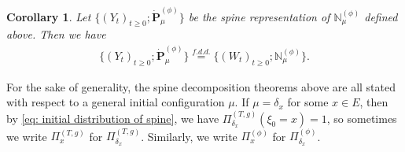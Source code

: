 \documentclass[UTF8]{pkuthss}
\theoremstyle{plain}
\newtheorem{cor}[thm]{Corollary}
\theoremstyle{definition}
\numberwithin{equation}{section}
\begin{document}
\begin{cor}
	Let $\{(Y_t)_{t\geq 0}; \dot {\mathbf P}^{(\phi)}_\mu\}$ be the spine representation of $\mathbb N^{(\phi)}_\mu$ defined above.
	Then we have
\begin{align}
	\{(Y_t)_{t\geq 0}; \dot{\mathbf P}^{(\phi)}_\mu\}
	\overset{f.d.d.}{=} \{(W_t)_{t\geq 0}; \mathbb N_\mu^{(\phi)}\}.
\end{align}
\end{cor}

	For the sake of generality, the spine decomposition theorems above are all stated with respect to a general initial configuration $\mu$.
	If $\mu = \delta_x$ for some $x\in E$, then by \eqref{eq: initial distribution of spine}, we have $\Pi_{\delta_x}^{(T,g)} (\xi_0 = x) = 1$, so sometimes we write $\Pi_x^{(T,g)}$ for $\Pi_{\delta_x}^{(T,g)}$.
	Similarly, we write $\Pi_x^{(\phi)}$ for $\Pi_{\delta_x}^{(\phi)}$.
\end{document}
